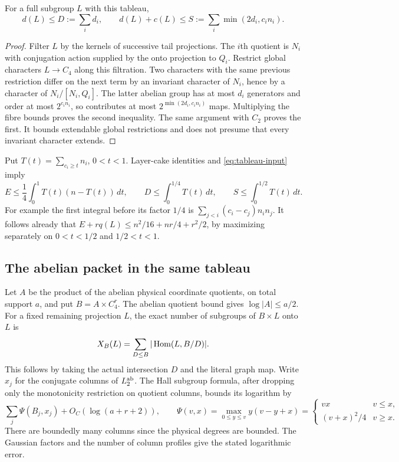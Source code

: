 \begin{lemma}\label{lem:two-columns}
For a full subgroup $L$ with this tableau,
\[
 d(L)\leq D:=\sum_i d_i,\qquad
 d(L)+c(L)\leq S:=\sum_i\min(2d_i,c_in_i).
\]
\end{lemma}
\begin{proof}
Filter $L$ by the kernels of successive tail projections. The $i$th
quotient is $N_i$ with conjugation action supplied by the onto
projection to $Q_i$. Restrict global characters $L\to C_4$ along
this filtration. Two characters with the same previous restriction
differ on the next term by an invariant character of $N_i$, hence
by a character of $N_i/[N_i,Q_i]$. The latter abelian group has at
most $d_i$ generators and order at most $2^{c_in_i}$, so contributes
at most $2^{\min(2d_i,c_in_i)}$ maps. Multiplying the fibre bounds proves
the second inequality. The same argument with $C_2$ proves the first.
It bounds extendable global restrictions and does not presume that
every invariant character extends.
\end{proof}

Put $T(t)=\sum_{c_i\geq t}n_i$, $0<t<1$. Layer-cake identities and
\eqref{eq:tableau-input} imply
\begin{equation}\label{eq:layer-cake}
 E\leq\frac14\int_0^1T(t)(n-T(t))\,dt,\qquad
 D\leq\int_0^{1/4}T(t)\,dt,\qquad
 S\leq\int_0^{1/2}T(t)\,dt.
\end{equation}
For example the first integral before its factor $1/4$ is
$\sum_{j<i}(c_i-c_j)n_in_j$. It follows already that
$E+rq(L)\leq n^2/16+nr/4+r^2/2$, by maximizing separately on
$0<t<1/2$ and $1/2<t<1$.

\subsection{The abelian packet in the same tableau}
Let $A$ be the product of the abelian physical coordinate quotients,
on total support $a$, and put $B=A\times C_4^r$. The abelian quotient
bound gives $\log|A|\leq a/2$. For a fixed remaining projection $L$,
the exact number of subgroups of $B\times L$ onto $L$ is
\begin{equation}\label{eq:abelian-packet}
 X_B(L)=\sum_{D\leq B}|\operatorname{Hom}(L,B/D)|.
\end{equation}
This follows by taking the actual intersection $D$ and the literal
graph map. Write $x_j$ for the conjugate columns of $L^{\rm ab}_2$.
The Hall subgroup formula, after dropping only the monotonicity
restriction on quotient columns, bounds its logarithm by
\[
 \sum_j\Psi(B_j,x_j)+O_C(\log(a+r+2)),\qquad
 \Psi(v,x)=\max_{0\leq y\leq v}y(v-y+x)
 =\begin{cases}vx&v\leq x,\\(v+x)^2/4&v\geq x.\end{cases}
\]
There are boundedly many columns since the physical degrees are bounded.
The Gaussian factors and the number of column profiles give the stated
logarithmic error.

